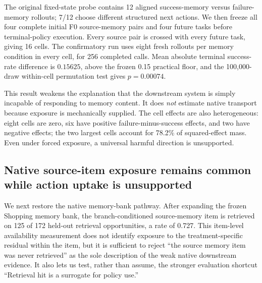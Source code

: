 The original fixed-state probe contains 12 aligned success-memory versus failure-memory rollouts; 7/12 choose different structured next actions. We then freeze all four complete initial F0 source-memory pairs and four future tasks before terminal-policy execution. Every source pair is crossed with every future task, giving 16 cells. The confirmatory run uses eight fresh rollouts per memory condition in every cell, for 256 completed calls. Mean absolute terminal success-rate difference is $0.15625$, above the frozen 0.15 practical floor, and the 100,000-draw within-cell permutation test gives $p=0.00074$.

This result weakens the explanation that the downstream system is simply incapable of responding to memory content. It does \emph{not} estimate native transport because exposure is mechanically supplied. The cell effects are also heterogeneous: eight cells are zero, six have positive failure-minus-success effects, and two have negative effects; the two largest cells account for 78.2\% of squared-effect mass. Even under forced exposure, a universal harmful direction is unsupported.

\subsection{Native source-item exposure remains common while action uptake is unsupported}
We next restore the native memory-bank pathway. After expanding the frozen Shopping memory bank, the branch-conditioned source-memory item is retrieved on 125 of 172 held-out retrieval opportunities, a rate of 0.727. This item-level availability measurement does not identify exposure to the treatment-specific residual within the item, but it is sufficient to reject ``the source memory item was never retrieved'' as the sole description of the weak native downstream evidence. It also lets us test, rather than assume, the stronger evaluation shortcut ``Retrieval hit is a surrogate for policy use.''

